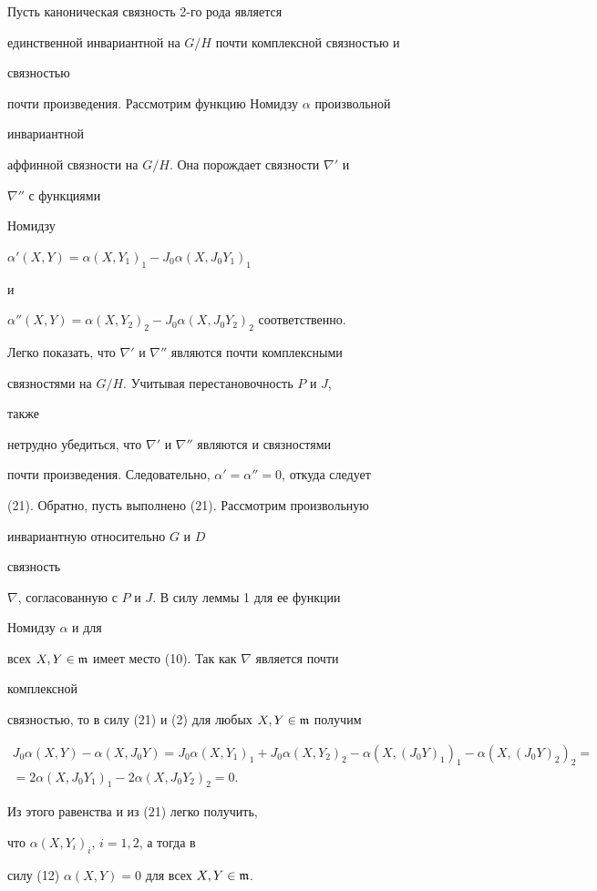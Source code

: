  


\begin{pf} Пусть каноническая связность 2-го рода является 


единственной инвариантной на $G/H$ почти комплексной связностью и 


связностью 


почти произведения. Рассмотрим функцию Номидзу $\alpha$ произвольной 


инвариантной 


аффинной связности на $G/H$. Она порождает связности $\nabla'$ и 


$\nabla''$ с функциями 


Номидзу 


$\alpha'(X,Y)=\alpha(X,Y_1)_1-J_0\alpha(X,J_0Y_1)_1$ 


и 


$\alpha''(X,Y)=\alpha(X,Y_2)_2-J_0\alpha(X,J_0Y_2)_2$ соответственно. 


Легко показать, что $\nabla'$ и $\nabla''$ являются почти комплексными 


связностями на $G/H$. Учитывая перестановочность $P$ и $J$, 


также 


нетрудно убедиться, что $\nabla'$ и $\nabla''$ являются и связностями 


почти произведения. Следовательно, $\alpha'=\alpha''=0$, откуда следует 


(21). Обратно, пусть выполнено (21). Рассмотрим произвольную 


инвариантную относительно $G$ и $D$ 


связность 


$\nabla$, согласованную с $P$ и $J$. В силу леммы 1 для ее функции 


Номидзу $\alpha$ и для 


всех $X,Y\in\frak m$ имеет место (10). Так как $\nabla$ является почти 


комплексной 


связностью, то в силу (21) и (2) для любых $X,Y\in\frak m$ получим 


\begin{multline*} 


J_0\alpha(X,Y)-\alpha(X,J_0Y)=J_0\alpha(X,Y_1)_1+ 


J_0\alpha(X,Y_2)_2-\alpha(X,(J_0Y)_1)_1- 


\alpha(X,(J_0Y)_2)_2= \\


=2\alpha(X,J_0Y_1)_1-2\alpha(X,J_0Y_2)_2=0. 


\end{multline*}  


Из этого равенства и из (21) легко получить, 


что $\alpha(X,Y_i)_i$, $i=1,2$, а тогда в 


силу (12)\; $\alpha(X,Y)=0$ для всех $X,Y\in\frak m$. 


\end{pf} 


